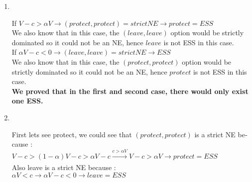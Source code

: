 \begin{enumerate}
    \item \phantom{text}
          \\
          \begin{latin}
              \noindent
              If $V-c > \alpha V \rightarrow (protect,protect) = strict NE \rightarrow protect = ESS$\\
              We also know that in this case, the $(leave,leave)$ option would be strictly dominated so it could not be an NE, hence $leave$ is not ESS in this case.\\
              If $\alpha V -c < 0 \rightarrow (leave,leave) = strict NE \rightarrow ESS$\\
              We also know that in this case, the $(protect,protect)$ option would be strictly dominated so it could not be an NE, hence $protect$ is not ESS in this case.
              \\
              \textbf{We proved that in the first and second case, there would only exist one ESS.}\\

          \end{latin}

    \item \phantom{text}
          \\
          \begin{latin}
              \noindent
              First lets see protect, we could see that $(protect,protect)$ is a strict NE because : \\
              $V-c > (1-\alpha )V -c > \alpha V - c \xrightarrow[]{c> \alpha V} V-c > \alpha V \rightarrow protect = ESS$ \\
              Also leave is a strict NE because : \\
              $\alpha V < c \rightarrow \alpha V -c < 0 \rightarrow leave = ESS$ \\\\


\end{latin}
\end{enumerate}
